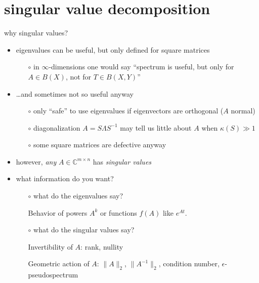 \documentclass[10pt,hyperref]{beamer}
\newcommand{\CC}{\mathbb{C}}
\newcommand{\eps}{\epsilon}
\begin{document}
\section{singular value decomposition}

\begin{frame}{why singular values?}

\begin{itemize}
\item eigenvalues can be useful, but only defined for square matrices
    \begin{itemize}
    \item[$\circ$] in $\infty$-dimensions one would say ``spectrum is useful, but only for $A\in B(X)$, not for $T \in B(X,Y)$''
    \end{itemize}
\item \dots and sometimes not so useful anyway
    \begin{itemize}
    \item[$\circ$] only ``safe'' to use eigenvalues if eigenvectors are orthogonal ($A$ normal)
    \item[$\circ$] diagonalization $A=S\Lambda S^{-1}$ may tell us little about $A$ when $\kappa(S)\gg 1$
    \item[$\circ$] some square matrices are defective anyway
    \end{itemize}
\item however, \emph{any} $A \in \CC^{m\times n}$ has \emph{singular values}
\item what information do you want?
    \begin{itemize}

\medskip
    \item[$\circ$] what do the \alert{eigenvalues} say?

\medskip
    Behavior of powers $A^k$ or functions $f(A)$ like $e^{At}$.

\medskip
    \item[$\circ$] what do the \alert{singular values} say?

\medskip
Invertibility of $A$: rank, nullity

\medskip
Geometric action of $A$: $\|A\|_2$, $\|A^{-1}\|_2$, condition number, $\eps$-pseudospectrum
    \end{itemize}
\end{itemize}
\end{frame}
\end{document}
